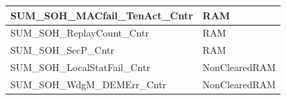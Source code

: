 \begin{longtable}{|l|l|}
\begin{minipage}{0.47\linewidth}\raggedright\vspace{.75ex}SUM\_SOH\_MACfail\_TenAct\_Cntr\vspace{.75ex}\end{minipage} & \begin{minipage}{0.47\linewidth}\raggedright\vspace{.75ex}RAM\vspace{.75ex}\end{minipage}\\\hline
\begin{minipage}{0.47\linewidth}\raggedright\vspace{.75ex}SUM\_SOH\_ReplayCount\_Cntr\vspace{.75ex}\end{minipage} & \begin{minipage}{0.47\linewidth}\raggedright\vspace{.75ex}RAM\vspace{.75ex}\end{minipage}\\\hline
\begin{minipage}{0.47\linewidth}\raggedright\vspace{.75ex}SUM\_SOH\_SecP\_Cntr\vspace{.75ex}\end{minipage} & \begin{minipage}{0.47\linewidth}\raggedright\vspace{.75ex}RAM\vspace{.75ex}\end{minipage}\\\hline
\begin{minipage}{0.47\linewidth}\raggedright\vspace{.75ex}SUM\_SOH\_LocalStatFail\_Cntr\vspace{.75ex}\end{minipage} & \begin{minipage}{0.47\linewidth}\raggedright\vspace{.75ex}NonClearedRAM\vspace{.75ex}\end{minipage}\\\hline
\begin{minipage}{0.47\linewidth}\raggedright\vspace{.75ex}SUM\_SOH\_WdgM\_DEMErr\_Cntr\vspace{.75ex}\end{minipage} & \begin{minipage}{0.47\linewidth}\raggedright\vspace{.75ex}NonClearedRAM\vspace{.75ex}\end{minipage}\\\hline

\end{longtable}
